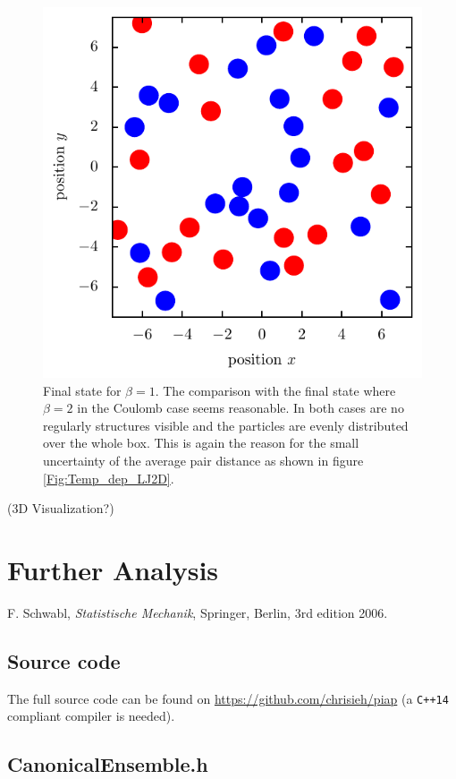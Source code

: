 \documentclass[11pt, a4paper]{article}
\numberwithin{equation}{section}
\newcommand{\remark}[1]{{\color{red}(#1)}}
\begin{document}
\begin{figure}[!h]
\centering
\includegraphics[scale=1]{figures/Beta_1_LJ.pdf}
\caption{Final state for $\beta = 1$.
The comparison with the final state where $\beta = 2$ in the Coulomb case seems reasonable.
In both cases are no regularly structures visible and the particles are evenly distributed over the whole box.
This is again the reason for the small uncertainty of the average pair distance as shown in figure \ref{Fig:Temp_dep_LJ2D}.}
\end{figure}
\remark{3D Visualization?}
\section{Further Analysis} \label{sec:Further_Analysis}



\FloatBarrier
\vspace{\fill}
\begin{thebibliography}{9}
	F. Schwabl,
	\emph{Statistische Mechanik},
	Springer, Berlin, 3rd edition 2006.
\end{thebibliography}

\begin{appendix}
	\newpage
	\section{Source code}
	The full source code can be found on \url{https://github.com/chrisieh/piap} (a \texttt{C++14} compliant compiler is needed).
	\subsection{CanonicalEnsemble{.}h} \label{sec:canonical_ensemble_source}
	
\end{appendix}
\end{document}
